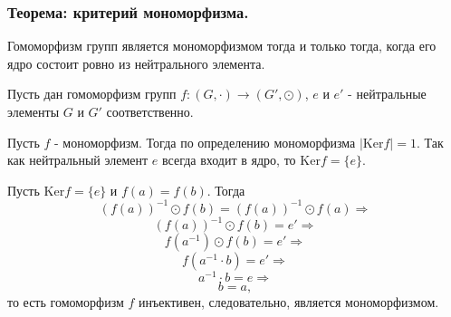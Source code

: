 
\subsubsection{Теорема: критерий мономорфизма.}
Гомоморфизм групп является мономорфизмом тогда и только тогда, когда его ядро состоит ровно из нейтрального элемента.

\dokvo
Пусть дан гомоморфизм групп $f:(G,\cdot) \to (G',\odot)$, $e$ и $e'$ - нейтральные элементы $G$ и $G'$ соответственно.

\neobh
Пусть $f$ - мономорфизм. Тогда по определению мономорфизма $|\mathrm{Ker} f|=1$. Так как нейтральный элемент $e$ всегда входит в ядро, то $\mathrm{Ker} f=\{e\}$.

\dost

Пусть $\mathrm{Ker} f=\{e\}$ и $f(a)=f(b)$. Тогда
$$ (f(a))^{-1} \odot f(b)=(f(a))^{-1} \odot f(a)\Rightarrow $$
$$ (f(a))^{-1} \odot f(b)=e' \Rightarrow $$
$$ f(a^{-1}) \odot f(b)=e' \Rightarrow $$
$$ f(a^{-1} \cdot b)=e' \Rightarrow $$
$$ a^{-1} \cdot b = e \Rightarrow $$
$$ b = a, $$
то есть гомоморфизм $f$ инъективен, следовательно, является мономорфизмом.
\dokno




